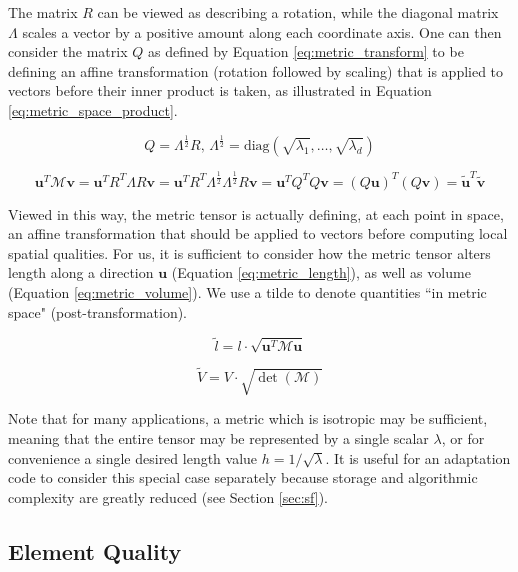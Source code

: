 The matrix $R$ can be viewed as describing a rotation,
while the diagonal matrix $\Lambda$ scales a vector by a positive
amount along each coordinate axis.
One can then consider the matrix $Q$ as
defined by Equation \ref{eq:metric_transform} to be defining
an affine transformation (rotation followed by scaling) that
is applied to vectors before their inner product is taken,
as illustrated in Equation \ref{eq:metric_space_product}.

\begin{equation} \label{eq:metric_transform}
Q = \Lambda^{\frac12} R,\,
\Lambda^{\frac12} = \text{diag}(\sqrt{\lambda_1},\dots,\sqrt{\lambda_d})
\end{equation}

\begin{equation} \label{eq:metric_space_product}
\mathbf{u}^T \mathcal{M}\mathbf{v} =
\mathbf{u}^T R^T\Lambda R\mathbf{v} =
\mathbf{u}^T R^T\Lambda^{\frac12} \Lambda^{\frac12}R\mathbf{v} =
\mathbf{u}^T Q^T Q\mathbf{v} =
(Q\mathbf{u})^T (Q\mathbf{v}) =
\tilde{\mathbf{u}}^T \tilde{\mathbf{v}}
\end{equation}

Viewed in this way, the metric tensor is actually defining,
at each point in space, an affine transformation that should
be applied to vectors before computing local spatial qualities.
For us, it is sufficient to consider how the metric tensor
alters length along a direction $\mathbf{u}$ (Equation \ref{eq:metric_length}),
as well as volume (Equation \ref{eq:metric_volume}).
We use a tilde to denote quantities ``in metric space" (post-transformation).

\begin{equation} \label{eq:metric_length}
\tilde{l} = l \cdot \sqrt{\mathbf{u}^T\mathcal{M}\mathbf{u}}
\end{equation}

\begin{equation} \label{eq:metric_volume}
\tilde{V} = V \cdot \sqrt{\det(\mathcal{M})}
\end{equation}

Note that for many applications, a metric which is isotropic
may be sufficient, meaning that the entire tensor may be represented
by a single scalar $\lambda$, or for convenience a single
desired length value $h=1/\sqrt{\lambda}$.
It is useful for an adaptation code to consider this special case
separately because storage and algorithmic complexity are greatly
reduced (see Section \ref{sec:sf}).

\subsection{Element Quality}
\label{sec:def_quality}

